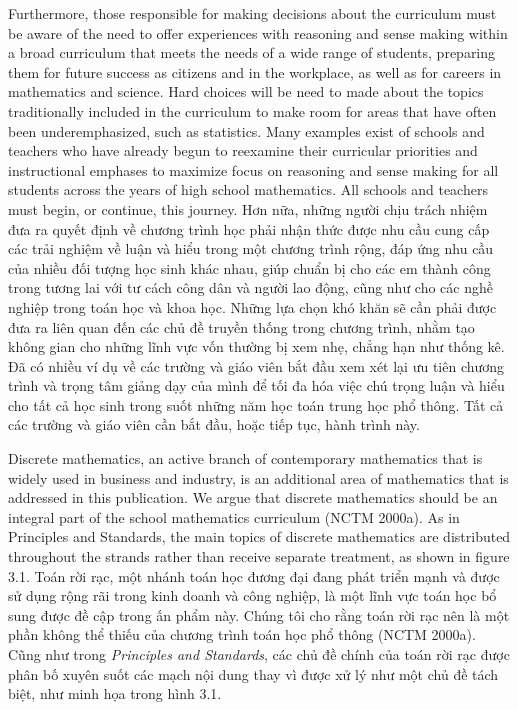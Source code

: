 \documentclass[
  10pt,
  a4paper,
  landscape,
  twoside,
  openany
]{scrbook}
\newcommand{\EN}[1]{#1}
\newcommand{\VI}[1]{#1}
\newcommand{\NOTE}[1]{#1}
\newcounter{example}
\begin{document}
\TriPara
{
\EN{Furthermore, those responsible for making decisions about the curriculum must be aware of the need to offer experiences with reasoning and sense making within a broad curriculum that meets the needs of a wide range of students, preparing them for future success as citizens and in the workplace, as well as for careers in mathematics and science. Hard choices will be need to made about the topics traditionally included in the curriculum to make room for areas that have often been underemphasized, such as statistics. Many examples exist of schools and teachers who have already begun to reexamine their curricular priorities and instructional emphases to maximize focus on reasoning and sense making for all students across the years of high school mathematics. All schools and teachers must begin, or continue, this journey.}
}
{
\VI{Hơn nữa, những người chịu trách nhiệm đưa ra quyết định về chương trình học phải nhận thức được nhu cầu cung cấp các trải nghiệm về luận và hiểu trong một chương trình rộng, đáp ứng nhu cầu của nhiều đối tượng học sinh khác nhau, giúp chuẩn bị cho các em thành công trong tương lai với tư cách công dân và người lao động, cũng như cho các nghề nghiệp trong toán học và khoa học. Những lựa chọn khó khăn sẽ cần phải được đưa ra liên quan đến các chủ đề truyền thống trong chương trình, nhằm tạo không gian cho những lĩnh vực vốn thường bị xem nhẹ, chẳng hạn như thống kê. Đã có nhiều ví dụ về các trường và giáo viên bắt đầu xem xét lại ưu tiên chương trình và trọng tâm giảng dạy của mình để tối đa hóa việc chú trọng luận và hiểu cho tất cả học sinh trong suốt những năm học toán trung học phổ thông. Tất cả các trường và giáo viên cần bắt đầu, hoặc tiếp tục, hành trình này.}
}
{
\NOTE{}
}

\TriPara
{
\EN{Discrete mathematics, an active branch of contemporary mathematics that is widely used in business and industry, is an additional area of mathematics that is addressed in this publication. We argue that discrete mathematics should be an integral part of the school mathematics curriculum (NCTM 2000a). As in Principles and Standards, the main topics of discrete mathematics are distributed throughout the strands rather than receive separate treatment, as shown in figure 3.1.}
}
{
\VI{Toán rời rạc, một nhánh toán học đương đại đang phát triển mạnh và được sử dụng rộng rãi trong kinh doanh và công nghiệp, là một lĩnh vực toán học bổ sung được đề cập trong ấn phẩm này. Chúng tôi cho rằng toán rời rạc nên là một phần không thể thiếu của chương trình toán học phổ thông (NCTM 2000a). Cũng như trong \emph{Principles and Standards}, các chủ đề chính của toán rời rạc được phân bố xuyên suốt các mạch nội dung thay vì được xử lý như một chủ đề tách biệt, như minh họa trong hình 3.1.}
}
{
\NOTE{}
}
\end{document}
